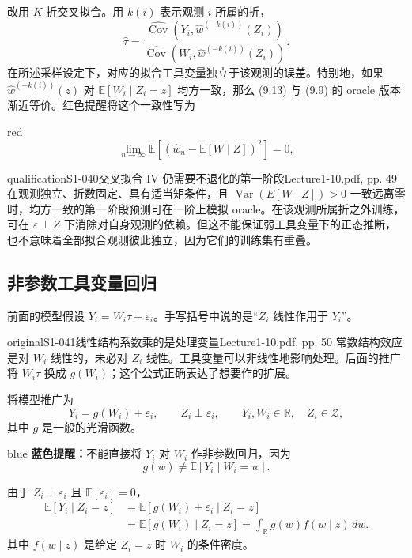 改用 $K$ 折交叉拟合。用 $k(i)$ 表示观测 $i$ 所属的折，
\[
 \widehat\tau=
 \frac{\widehat{\operatorname{Cov}}(Y_i,\widehat w^{(-k(i))}(Z_i))}
 {\widehat{\operatorname{Cov}}(W_i,\widehat w^{(-k(i))}(Z_i))}.\tag{9.13}
\]
在所述采样设定下，对应的拟合工具变量独立于该观测的误差。特别地，如果 $\widehat w^{(-k(i))}(z)$ 对 $\mathbb E[W_i\mid Z_i=z]$ 均方一致，那么 (9.13) 与 (9.9) 的 oracle 版本渐近等价。红色提醒将这个一致性写为
\begin{inkblock}{red}
\[
 \lim_{n\to\infty}\mathbb E[(\widehat w_n-\mathbb E[W\mid Z])^2]=0,
\]
\end{inkblock}
\begin{reviewnote}{qualification}{S1-040}{交叉拟合 IV 仍需要不退化的第一阶段}{Lecture1-10.pdf, pp. 49}
在观测独立、折数固定、具有适当矩条件，且 $\operatorname{Var}(E[W\mid Z])>0$ 一致远离零时，均方一致的第一阶段预测可在一阶上模拟 oracle。在该观测所属折之外训练，可在 $\varepsilon\perp Z$ 下消除对自身观测的依赖。但这不能保证弱工具变量下的正态推断，也不意味着全部拟合观测彼此独立，因为它们的训练集有重叠。
\end{reviewnote}


\subsection{非参数工具变量回归}
前面的模型假设 $Y_i=W_i\tau+\varepsilon_i$。手写括号中说的是“$Z_i$ 线性作用于 $Y_i$”。
\begin{reviewnote}{original}{S1-041}{线性结构系数乘的是处理变量}{Lecture1-10.pdf, pp. 50}
常数结构效应是对 $W_i$ 线性的，未必对 $Z_i$ 线性。工具变量可以非线性地影响处理。后面的推广将 $W_i\tau$ 换成 $g(W_i)$；这个公式正确表达了想要作的扩展。
\end{reviewnote}
将模型推广为
\[
 Y_i=g(W_i)+\varepsilon_i,\qquad Z_i\perp\varepsilon_i,
 \qquad Y_i,W_i\in\mathbb R,\quad Z_i\in\mathcal Z,
\]
其中 $g$ 是一般的光滑函数。\begin{inkblock}{blue}
\textbf{蓝色提醒：}不能直接将 $Y_i$ 对 $W_i$ 作非参数回归，因为
\[
 g(w)\ne\mathbb E[Y_i\mid W_i=w].
\]
\end{inkblock}



由于 $Z_i\perp\varepsilon_i$ 且 $\mathbb E[\varepsilon_i]=0$，
\begin{align*}
 \mathbb E[Y_i\mid Z_i=z]
 &=\mathbb E[g(W_i)+\varepsilon_i\mid Z_i=z]\\
 &=\mathbb E[g(W_i)\mid Z_i=z]
 =\int_{\mathbb R}g(w)f(w\mid z)\,dw.\tag{9.15}
\end{align*}
其中 $f(w\mid z)$ 是给定 $Z_i=z$ 时 $W_i$ 的条件密度。

